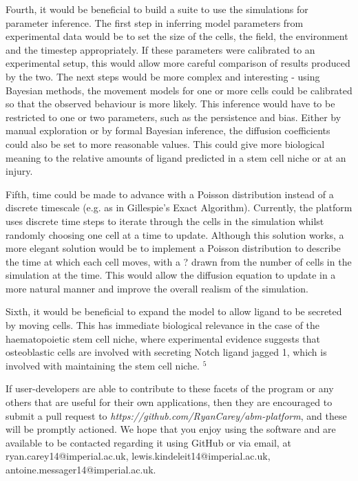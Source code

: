 \documentclass[11.5pt]{article}
\begin{document}
Fourth, it would be beneficial to build a suite to use the simulations 
for parameter inference. The first step in inferring model parameters 
from experimental data would be to set the size of the cells, the field, 
the environment and the timestep appropriately. If these parameters were 
calibrated to an experimental setup, this would allow more careful 
comparison of results produced by the two. The next steps would be more 
complex and interesting - using Bayesian methods, the movement models 
for one or more cells could be calibrated so that the observed behaviour 
is more likely. This inference would have to be restricted to one or two 
parameters, such as the persistence and bias. Either by manual 
exploration or by formal Bayesian inference, the diffusion coefficients 
could also be set to more reasonable values. This could give more 
biological meaning to the relative amounts of ligand predicted in a stem 
cell niche or at an injury.

Fifth, time could be made to advance with a Poisson distribution instead 
of a discrete timescale (e.g. as in Gillespie's Exact Algorithm). 
Currently, the platform uses discrete time steps to iterate through the 
cells in the simulation whilst randomly choosing one cell at a time to 
update. Although this solution works, a more elegant solution would be 
to implement a Poisson distribution to describe the time at which each 
cell moves, with a ? drawn from the number of cells in the simulation at 
the time. This would allow the diffusion equation to update in a more 
natural manner and improve the overall realism of the simulation.

Sixth, it would be beneficial to expand the model to allow ligand to be 
secreted by moving cells. This has immediate biological relevance in the 
case of the haematopoietic stem cell niche, where experimental evidence 
suggests that osteoblastic cells are involved with secreting Notch 
ligand jagged 1, which is involved with maintaining the stem cell niche.
$^{5}$

If user-developers are able to contribute to these facets of the program 
or any others that are useful for their own applications, then they are 
encouraged to submit a pull request to {\itshape 
https://github.com/RyanCarey/abm-platform}, and these will be
promptly actioned. We hope that you enjoy using the software 
and are available to be contacted regarding it using GitHub or via 
email, at ryan.carey14@imperial.ac.uk, 
lewis.kindeleit14@imperial.ac.uk, 
antoine.messager14@imperial.ac.uk.
\end{document}
